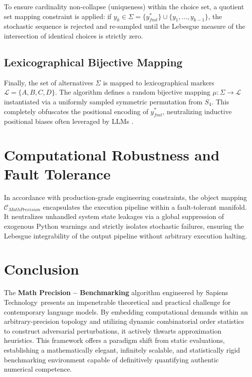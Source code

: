 \documentclass[12pt, a4paper]{article}
\begin{document}
To ensure cardinality non-collapse (uniqueness) within the choice set, a quotient set mapping constraint is applied: if $y_k \in \Sigma = \{y^*_{fmt}\} \cup \{y_1, \dots, y_{k-1}\}$, the stochastic sequence is rejected and re-sampled until the Lebesgue measure of the intersection of identical choices is strictly zero. 

\subsection{Lexicographical Bijective Mapping}
Finally, the set of alternatives $\Sigma$ is mapped to lexicographical markers $\mathcal{L} = \{A, B, C, D\}$. The algorithm defines a random bijective mapping $\mu: \Sigma \to \mathcal{L}$ instantiated via a uniformly sampled symmetric permutation from $S_4$. This completely obfuscates the positional encoding of $y^*_{fmt}$, neutralizing inductive positional biases often leveraged by LLMs \cite{cobbe2021}.

\section{Computational Robustness and Fault Tolerance}
In accordance with production-grade engineering constraints, the object mapping $\mathscr{C}_{MathPrecision}$ encapsulates the execution pipeline within a fault-tolerant manifold. It neutralizes unhandled system state leakages via a global suppression of exogenous Python warnings and strictly isolates stochastic failures, ensuring the Lebesgue integrability of the output pipeline without arbitrary execution halting.

\section{Conclusion}

The \textbf{Math Precision -- Benchmarking} algorithm engineered by Sapiens Technology\textregistered \ presents an impenetrable theoretical and practical challenge for contemporary language models. By embedding computational demands within an arbitrary-precision topology and utilizing dynamic combinatorial order statistics to construct adversarial perturbations, it actively thwarts approximation heuristics. This framework offers a paradigm shift from static evaluations, establishing a mathematically elegant, infinitely scalable, and statistically rigid benchmarking environment capable of definitively quantifying authentic numerical competence.
\end{document}
